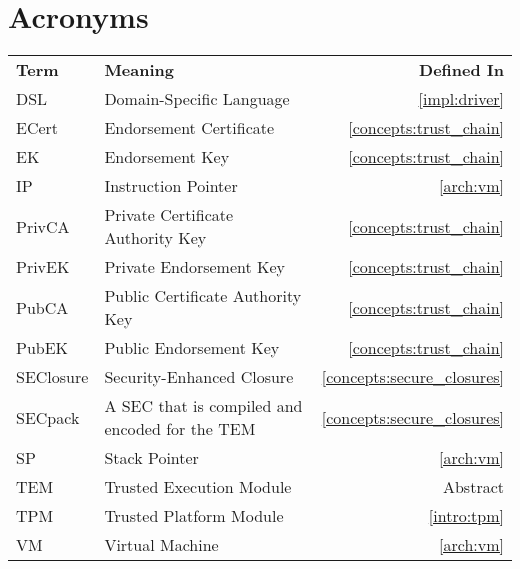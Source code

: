 \chapter{Acronyms}

\begin{tabular}{llr}
\textbf{Term} & \textbf{Meaning} & \textbf{Defined In} \\
DSL & Domain-Specific Language & \ref{impl:driver} \\
ECert & Endorsement Certificate & \ref{concepts:trust_chain} \\
EK & Endorsement Key & \ref{concepts:trust_chain} \\
IP & Instruction Pointer & \ref{arch:vm} \\
PrivCA & Private Certificate Authority Key & \ref{concepts:trust_chain} \\
PrivEK & Private Endorsement Key & \ref{concepts:trust_chain} \\
PubCA & Public Certificate Authority Key & \ref{concepts:trust_chain} \\
PubEK & Public Endorsement Key & \ref{concepts:trust_chain} \\
SEClosure & Security-Enhanced Closure & \ref{concepts:secure_closures} \\
SECpack & A SEC that is compiled and encoded for the TEM &
\ref{concepts:secure_closures} \\
SP & Stack Pointer & \ref{arch:vm} \\
TEM & Trusted Execution Module & Abstract \\
TPM & Trusted Platform Module & \ref{intro:tpm} \\
VM & Virtual Machine & \ref{arch:vm} \\
\end{tabular}
